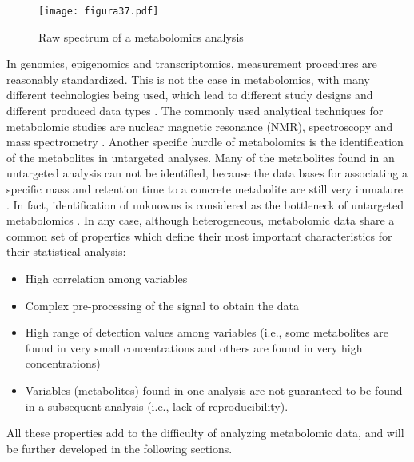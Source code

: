 \begin{figure}[htbp]\centering
		\texttt{[image: figura37.pdf]}
		\caption{Raw spectrum of a metabolomics analysis}
		\label{figura37}
	\end{figure}

In genomics, epigenomics and transcriptomics, measurement procedures are reasonably standardized. This is not the case in metabolomics, with many different technologies being used, which lead to different study designs and different produced data types \parencite{moco2007metabolomics}. The commonly used analytical techniques for metabolomic studies are nuclear magnetic resonance (NMR), spectroscopy and mass spectrometry \parencite{buscher2009cross}. Another specific hurdle of metabolomics is the identification of the metabolites in untargeted analyses. Many of the metabolites found in an untargeted analysis can not be identified, because the data bases for associating a specific mass and retention time to a concrete metabolite are still very immature \parencite{mathew2013metabolomics}. In fact, identification of unknowns is considered as the bottleneck of untargeted metabolomics \parencite{bingol2018recent}.
In any case, although heterogeneous, metabolomic data share a common set of properties which define their most important characteristics for their statistical analysis:

\begin{itemize}
    \item High correlation among variables
    \item Complex pre-processing of the signal to obtain the data
    \item High range of detection values among variables (i.e., some metabolites are found in very small concentrations and others are found in very high concentrations)
    \item Variables (metabolites) found in one analysis are not guaranteed to be found in a subsequent analysis (i.e., lack of reproducibility).
\end{itemize}

All these properties add to the difficulty of analyzing metabolomic data, and will be further developed in the following sections.

